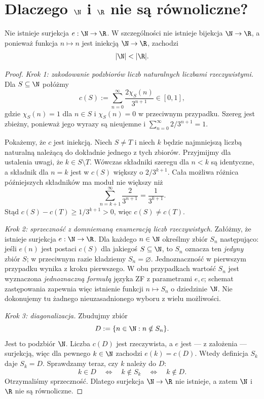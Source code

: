 \section{Dlaczego \texorpdfstring{$\N$}{N} i \texorpdfstring{$\R$}{R} nie są równoliczne?}\label{sec:card-n-vs-r}
\begin{twierdzenie}\label{thm:card-n-not-r}
Nie istnieje surjekcja $e:\N\to\R$.
W szczególności nie istnieje bijekcja $\N\to\R$, a ponieważ
funkcja $n\mapsto n$ jest iniekcją $\N\to\R$, zachodzi
\[
|\N|<|\R|.
\]
\end{twierdzenie}
\begin{proof}
\emph{Krok 1: zakodowanie podzbiorów liczb naturalnych liczbami rzeczywistymi.}
Dla $S\subseteq\N$ połóżmy
\[
 c(S):=\sum_{n=0}^{\infty}\frac{2\chi_S(n)}{3^{n+1}}\in[0,1],
\]
gdzie $\chi_S(n)=1$ dla $n\in S$ i $\chi_S(n)=0$ w przeciwnym przypadku.
Szereg jest zbieżny, ponieważ jego wyrazy są nieujemne i
$\sum_{n=0}^{\infty}2/3^{n+1}=1$.

Pokażemy, że $c$ jest iniekcją. Niech $S\ne T$ i niech $k$
będzie najmniejszą liczbą naturalną należącą do dokładnie
jednego z tych zbiorów. Przyjmijmy dla ustalenia uwagi, że
$k\in S\setminus T$. Wówczas składniki szeregu dla $n<k$ są identyczne,
a składnik dla $n=k$ jest w $c(S)$ większy o $2/3^{k+1}$.
Cała możliwa różnica późniejszych składników ma moduł
nie większy niż
\[
\sum_{n=k+1}^{\infty}\frac{2}{3^{n+1}}
=\frac{1}{3^{k+1}}.
\]
Stąd $c(S)-c(T)\ge 1/3^{k+1}>0$, więc $c(S)\ne c(T)$.

\emph{Krok 2: sprzeczność z domniemaną enumeracją liczb rzeczywistych.}
Załóżmy, że istnieje surjekcja $e:\N\to\R$.
Dla każdego $n\in\N$ określmy zbiór $S_n$ następująco:
jeśli $e(n)$ jest postaci $c(S)$ dla jakiegoś $S\subseteq\N$,
to $S_n$ oznacza ten \emph{jedyny} zbiór $S$;
w przeciwnym razie kładziemy $S_n=\varnothing$.
Jednoznaczność w pierwszym przypadku wynika z kroku pierwszego.
W obu przypadkach wartość $S_n$ jest wyznaczona
\emph{jednoznaczną formułą} języka ZF z parametrami $e,c$;
schemat zastępowania zapewnia więc istnienie
funkcji $n\mapsto S_n$ o dziedzinie $\N$.
Nie dokonujemy tu żadnego nieuzasadnionego wyboru z wielu możliwości.

\emph{Krok 3: diagonalizacja.}
Zbudujmy zbiór
\[
D:=\{n\in\N:n\notin S_n\}.
\]
Jest to podzbiór $\N$. Liczba $c(D)$ jest rzeczywista,
a $e$ jest — z założenia — surjekcją, więc dla pewnego $k\in\N$
zachodzi $e(k)=c(D)$. Wtedy definicja $S_k$ daje $S_k=D$.
Sprawdzamy teraz, czy $k$ należy do $D$:
\[
 k\in D\quad\Longleftrightarrow\quad k\notin S_k
 \quad\Longleftrightarrow\quad k\notin D.
\]
Otrzymaliśmy sprzeczność. Dlatego surjekcja $\N\to\R$
nie istnieje, a zatem $\N$ i $\R$ nie są równoliczne.
\end{proof}
